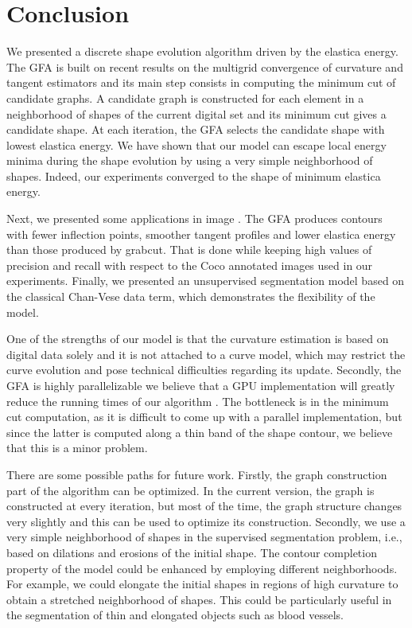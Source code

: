 \documentclass[review]{siamart220329}
\begin{document}
\section{Conclusion}
%
%
We presented a discrete shape evolution algorithm driven by the elastica energy.
The GFA is built on recent results on the multigrid convergence of curvature and
tangent estimators and its main step consists in computing the minimum cut of
candidate graphs. A candidate graph is constructed for each element in a
neighborhood of shapes of the current digital set and its minimum cut gives a
candidate shape. At each iteration, the GFA selects the candidate shape with
lowest elastica energy. We have shown that our model can escape local energy
minima during the shape evolution by using a very simple neighborhood of shapes.
Indeed, our experiments converged to the shape of minimum elastica energy. 

Next, we presented some applications in image
. The GFA produces contours with
fewer inflection points, smoother tangent profiles and lower elastica energy
than those produced by grabcut. That is done while
keeping high values of precision and recall with respect to the Coco annotated
images used in our experiments. Finally, we presented an unsupervised
segmentation model based on the classical Chan-Vese data term, which
demonstrates the flexibility of the model. 

One of the strengths of our model is that the curvature estimation is based on
digital data solely and it is not attached to a curve model, which may restrict
the curve evolution and pose technical difficulties regarding its update.
Secondly, the GFA is highly parallelizable  we believe
that a GPU implementation will greatly reduce the running times of our algorithm
. The bottleneck is in the
minimum cut computation, as it is difficult to come up with a parallel
implementation, but since the latter is computed along a thin band of the shape
contour, we believe that this is a minor problem.

There are some possible paths for future work. Firstly, the graph construction
part of the algorithm can be optimized. In the current version, the graph is
constructed at every iteration, but most of the time, the graph structure
changes very slightly and this can be used to optimize its construction.
Secondly, we use a very simple neighborhood of shapes in the supervised
segmentation problem, i.e., based on dilations and erosions of the initial
shape. The contour completion property of the model could be enhanced by
employing different neighborhoods. For example, we could elongate the initial
shapes in regions of high curvature to obtain a stretched neighborhood of
shapes. This could be particularly useful in the segmentation of thin and
elongated objects such as blood vessels.
%
%
%
%


\end{document}
